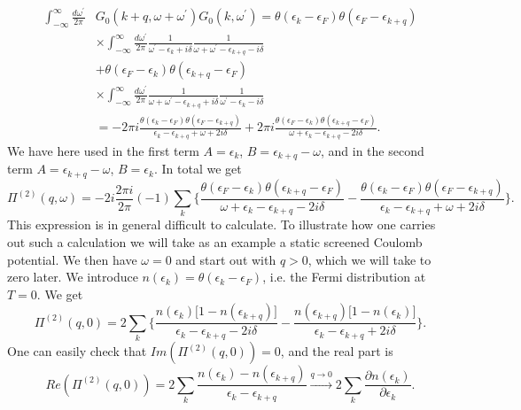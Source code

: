 \begin{align*}
\int_{-\infty}^{\infty}\frac{d\omega^{\prime}}{2\pi}&G_0(k+q,\omega+\omega^{\prime})G_0(k,\omega^{\prime})=\theta(\epsilon_k-\epsilon_F)\theta(\epsilon_F-\epsilon_{k+q})\\
&\times\int_{-\infty}^{\infty}\frac{d\omega^{\prime}}{2\pi}\frac{1}{\omega^{\prime}-\epsilon_k+i\delta}\frac{1}{\omega+\omega^{\prime}-\epsilon_{k+q}-i\delta}\\
&+\theta(\epsilon_F-\epsilon_k)\theta(\epsilon_{k+q}-\epsilon_F)\\
&\times\int_{-\infty}^{\infty}\frac{d\omega^{\prime}}{2\pi}\frac{1}{\omega+\omega^{\prime}-\epsilon_{k+q}+i\delta}\frac{1}{\omega^{\prime}-\epsilon_k-i\delta}\\
&=-2\pi i\frac{\theta(\epsilon_k-\epsilon_F)\theta(\epsilon_F-\epsilon_{k+q})}{\epsilon_k-\epsilon_{k+q}+\omega+2i\delta}+2\pi i\frac{\theta(\epsilon_F-\epsilon_k)\theta(\epsilon_{k+q}-\epsilon_F)}{\omega+\epsilon_k-\epsilon_{k+q}-2i\delta}.
\end{align*}
We have here used in the first term $A=\epsilon_k$, $B=\epsilon_{k+q}-\omega$, and in the second term $A=\epsilon_{k+q}-\omega$, $B=\epsilon_k$. In total we get
\begin{equation}
\Pi^{(2)}(q,\omega)=-2i\frac{2\pi i}{2\pi}(-1)\sum_{k}\{\frac{\theta(\epsilon_F-\epsilon_k)\theta(\epsilon_{k+q}-\epsilon_F)}{\omega+\epsilon_k-\epsilon_{k+q}-2i\delta}-\frac{\theta(\epsilon_k-\epsilon_F)\theta(\epsilon_F-\epsilon_{k+q})}{\epsilon_k-\epsilon_{k+q}+\omega+2i\delta}\}.
\end{equation}
This expression is in general difficult to calculate. To illustrate how one carries out such a calculation we will take as an example a static screened Coulomb potential. We then have $\omega=0$ and start out with $q>0$, which we will take to zero later. We introduce $n(\epsilon_k)=\theta(\epsilon_k-\epsilon_F)$, i.e. the Fermi distribution at $T=0$. We get
\begin{equation}
\Pi^{(2)}(q,0)=2\sum_k\{\frac{n(\epsilon_k)\big[1-n(\epsilon_{k+q})\big]}{\epsilon_k-\epsilon_{k+q}-2i\delta}-\frac{n(\epsilon_{k+q})\big[1-n(\epsilon_k)\big]}{\epsilon_k-\epsilon_{k+q}+2i\delta}\}.
\end{equation}
One can easily check that $Im(\Pi^{(2)}(q,0))=0$, and the real part is
\begin{equation}
Re(\Pi^{(2)}(q,0))=2\sum_k\frac{n(\epsilon_k)-n(\epsilon_{k+q})}{\epsilon_k-\epsilon_{k+q}}\stackrel{q\rightarrow 0}{\rightarrow}2\sum_k\frac{\partial n(\epsilon_k)}{\partial \epsilon_k}.
\end{equation}
